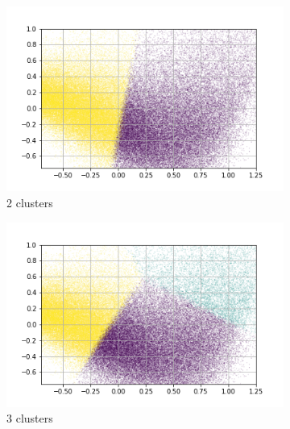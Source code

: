 \begin{figure}
     \centering
     \begin{subfigure}[b]{0.4\textwidth}
         \centering
         \includegraphics[width=\textwidth]{results/TopicDetection/fr/PCA_2.png}
         \caption{2 clusters}
         \label{fig:fr_kmeans_2}
     \end{subfigure}
     \hfill
     \begin{subfigure}[b]{0.4\textwidth}
         \centering
         \includegraphics[width=\textwidth]{results/TopicDetection/fr/PCA_3.png}
         \caption{3 clusters}
         \label{fig:fr_kmeans_3}
     \end{subfigure}
     \hfill
     \begin{subfigure}[b]{0.4\textwidth}
         \centering

\end{subfigure}
\end{figure}
